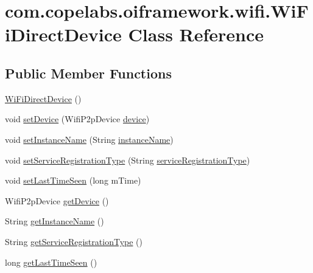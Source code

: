 \hypertarget{classcom_1_1copelabs_1_1oiframework_1_1wifi_1_1_wi_fi_direct_device}{}\section{com.\+copelabs.\+oiframework.\+wifi.\+Wi\+Fi\+Direct\+Device Class Reference}
\label{classcom_1_1copelabs_1_1oiframework_1_1wifi_1_1_wi_fi_direct_device}
\subsection*{Public Member Functions}
\begin{DoxyCompactItemize}
\item 
\hyperlink{classcom_1_1copelabs_1_1oiframework_1_1wifi_1_1_wi_fi_direct_device_a7bd474414b2e79e3319b2147e7288bd7}{Wi\+Fi\+Direct\+Device} ()
\item 
void \hyperlink{classcom_1_1copelabs_1_1oiframework_1_1wifi_1_1_wi_fi_direct_device_a279aa058cc7be37d1111d4830f80be71}{set\+Device} (Wifi\+P2p\+Device \hyperlink{classcom_1_1copelabs_1_1oiframework_1_1wifi_1_1_wi_fi_direct_device_ae8eb9ce4fe61f8816bc1d782920c3062}{device})
\item 
void \hyperlink{classcom_1_1copelabs_1_1oiframework_1_1wifi_1_1_wi_fi_direct_device_af38ebd62b4bdf2c1f3f5da5061c64c26}{set\+Instance\+Name} (String \hyperlink{classcom_1_1copelabs_1_1oiframework_1_1wifi_1_1_wi_fi_direct_device_a777116482205bdc4277dd67b97eb759e}{instance\+Name})
\item 
void \hyperlink{classcom_1_1copelabs_1_1oiframework_1_1wifi_1_1_wi_fi_direct_device_a58ac586803a114d87a269951168df8df}{set\+Service\+Registration\+Type} (String \hyperlink{classcom_1_1copelabs_1_1oiframework_1_1wifi_1_1_wi_fi_direct_device_a53d05b7aa0924e76b0c2b567affb1112}{service\+Registration\+Type})
\item 
void \hyperlink{classcom_1_1copelabs_1_1oiframework_1_1wifi_1_1_wi_fi_direct_device_adeabc501f12f316bec96f5955f3c7ad5}{set\+Last\+Time\+Seen} (long m\+Time)
\item 
Wifi\+P2p\+Device \hyperlink{classcom_1_1copelabs_1_1oiframework_1_1wifi_1_1_wi_fi_direct_device_ae967d6513dc4b32e22e75a15a2f2e041}{get\+Device} ()
\item 
String \hyperlink{classcom_1_1copelabs_1_1oiframework_1_1wifi_1_1_wi_fi_direct_device_a98d80ea23930328f27f430cf60918540}{get\+Instance\+Name} ()
\item 
String \hyperlink{classcom_1_1copelabs_1_1oiframework_1_1wifi_1_1_wi_fi_direct_device_adcb8042f950497d18987766e7c0b9b81}{get\+Service\+Registration\+Type} ()
\item 
long \hyperlink{classcom_1_1copelabs_1_1oiframework_1_1wifi_1_1_wi_fi_direct_device_ac7dc2702eaac0636f254580f3ce3282e}{get\+Last\+Time\+Seen} ()
\end{DoxyCompactItemize}
